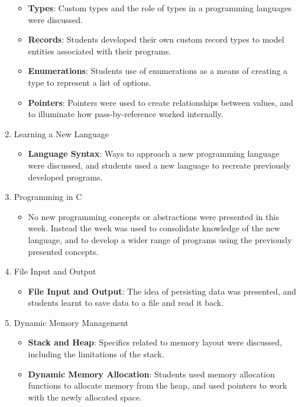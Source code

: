 \begin{enumerate}
  \begin{itemize}[noitemsep,nolistsep]
  	\item \textbf{Types}: Custom types and the role of types in a programming languages were discussed.
  	\item \textbf{Records}: Students developed their own custom record types to model entities associated with their programs.
  	\item \textbf{Enumerations}: Students use of enumerations as a means of creating a type to represent a list of options.
  	\item \textbf{Pointers}: Pointers were used to create relationships between values, and to illuminate how pass-by-reference worked internally.
  \end{itemize}
  \item Learning a New Language
  \begin{itemize}[noitemsep,nolistsep]
  	\item \textbf{Language Syntax}: Ways to approach a new programming language were discussed, and students used a new language to recreate previously developed programs.
  \end{itemize}
  \item Programming in C
  \begin{itemize}[noitemsep,nolistsep]
  	\item No new programming concepts or abstractions were presented in this week. Instead the week was used to consolidate knowledge of the new language, and to develop a wider range of programs using the previously presented concepts.
  \end{itemize}
  \item File Input and Output
  \begin{itemize}[noitemsep,nolistsep]
  	\item \textbf{File Input and Output}: The idea of persisting data was presented, and students learnt to save data to a file and read it back. 
  \end{itemize}

  \item Dynamic Memory Management
  \begin{itemize}[noitemsep,nolistsep]
  	\item \textbf{Stack and Heap}: Specifics related to memory layout were discussed, including the limitations of the stack.
  	\item \textbf{Dynamic Memory Allocation}: Students used memory allocation functions to allocate memory from the heap, and used pointers to work with the newly allocated space.
  \end{itemize}


\end{enumerate}
